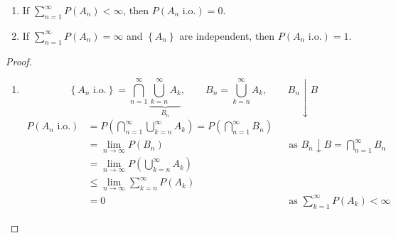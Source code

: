 \begin{reqnoproof}
\begin{theorem}
    \begin{enumerate}[label=\roman*)]
        \item If $\sum_{n=1}^\infty P(A_n) < \infty$, then $P(A_n \text{ i.o.}) = 0$.
        \item If $\sum_{n=1}^\infty P(A_n) = \infty$ and $\left\{A_n\right\}$ are independent, then $P(A_n \text{ i.o.}) = 1$.
    \end{enumerate}
    \begin{proof}
        \begin{enumerate}[label=\roman*)]
            \item
            \[\left\{A_n \text{ i.o.}\right\} = \bigcap_{n=1}^\infty \underbrace{\bigcup_{k=n}^\infty A_k}_{B_n}, \qquad B_n = \bigcup_{k=n}^\infty A_k, \qquad B_n \downarrow B\]
            \begin{align*}
                P(A_n \text{ i.o.}) &= P\left(\bigcap_{n=1}^\infty\bigcup_{k=n}^\infty A_k\right) = P\left(\bigcap_{n=1}^\infty B_n\right)\\
                &= \lim_{n\to\infty} P(B_n) & &\text{as } B_n \downarrow B = \textstyle\bigcap_{n=1}^\infty B_n\\
                &= \lim_{n\to\infty} P\left(\bigcup_{k=n}^\infty A_k\right)\\
                &\leq \lim_{n\to\infty} \sum_{k=n}^\infty P(A_k)\\
                &= 0 & &\text{as } \textstyle\sum_{k=1}^\infty P(A_k) < \infty
            \end{align*}


\end{enumerate}
\end{proof}
\end{theorem}
\end{reqnoproof}
